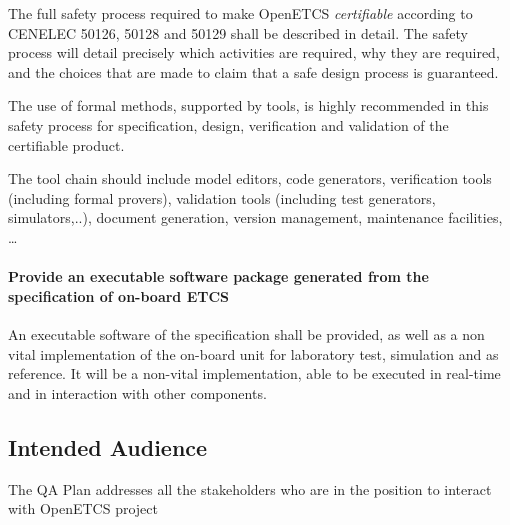\documentclass{template/openetcs_article}
\begin{document}
The full safety process required to make OpenETCS \emph{certifiable} according to CENELEC 50126, 50128 and 50129 shall be described in detail. The safety process will detail precisely which activities are required, why they are required, and the choices that are made to claim that a safe design process is guaranteed.

The use of formal methods, supported by tools, is highly recommended in this safety process for specification, design, verification and validation of the certifiable product.

The tool chain should include model editors, code generators, verification tools (including formal provers), validation tools (including test generators, simulators,..), document generation, version management, maintenance facilities, \dots

\paragraph{Provide an executable software package generated from the specification of on-board ETCS}

An executable software of the specification shall be provided, as well as a non vital implementation of the on-board unit for laboratory test, simulation and as reference. It will be a non-vital  implementation, able to be executed in real-time and in interaction with other components.


\subsection{Intended Audience}

The QA Plan addresses all the stakeholders who are in the position to interact with OpenETCS project
\end{document}
